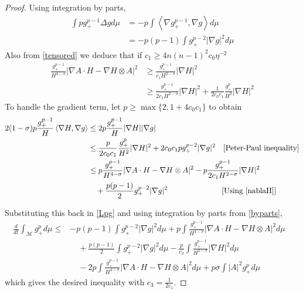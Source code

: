 \begin{proof}
    Using integration by parts, 
    \begin{align}
        \int pg_{+}^{p-1} \Delta g d \mu & = - p\int \left< \nabla g_{+}^{p-1}, \nabla g \right> d \mu \nonumber\\
        & = -p(p-1) \int g_{+}^{p-2}| \nabla g|^{2} d \mu \label{byparts}
    \end{align}
    Also from \cref{tensored} we deduce that if $ c_{1} \ge 4 n(n-1)^{2}c_{0} \eta^{-2} $ 
    \begin{align}
        \frac{g_{+}^{p-1}}{H^{4-\sigma}}|\nabla A \cdot H - \nabla H \otimes A|^{2} &\ge \frac{g_{+}^{p-1}}{c_{1}H^{2-\sigma}}| \nabla H|^{2} \nonumber\\
        & \ge \frac{g_{+}^{p-1}}{2c_{1}H^{2-\sigma}}| \nabla H|^{2} + \frac{1}{2c_{0}c_{1}} \frac{g_{+}^{p}}{H^{2}}| \nabla H|^{2} \label{nablaH}
    \end{align}
    To handle the gradient term, let $ p \ge \max \{2,1+4c_{0}c_{1} \} $ to obtain \begin{align*}
        2(1-\sigma)p \frac{g_{+}^{p-1}}{H} \left< \nabla H, \nabla g \right> & \le 2p \frac{g_{+}^{p-1}}{H} |\nabla H| |\nabla g| \\
        & \le \frac{p}{2c_{0}c_{1}} \frac{g_{+}^{p}}{H^{2}}|\nabla H|^{2} + 2c_{0}c_{1}pg_{+}^{p-2}|\nabla g|^{2} \quad [\text{Peter-Paul inequality}] \\
        & \le p \frac{g_{+}^{p-1}}{H^{4-\sigma}}|\nabla A \cdot H - \nabla H \otimes A|^{2} - p \frac{g_{+}^{p-1}}{2c_{1}H^{2-\sigma}}|\nabla H|^{2} \\
        & \quad + \frac{p(p-1)}{2}g_{+}^{p-2}|\nabla g|^{2} \qquad \qquad\quad  \qquad[\text{Using \cref{nablaH}}]
    \end{align*}

    Substituting this back in \cref{Lpg} and using integration by parts from \cref{byparts}, \begin{align*}
        \frac{d}{dt} \int_{ \mathcal{M}} g_{+}^{p} d \mu \le & -p(p-1)\int g_{+}^{p-2}|\nabla g|^{2} d \mu + p \int \frac{g_{+}^{p-1}}{H^{4-\sigma}}|\nabla A \cdot H - \nabla H \otimes A|^{2}d \mu & \\
        & \quad + \frac{p(p-1)}{2}\int g_{+}^{p-2}|\nabla g|^{2}d \mu - \frac{p}{c_{3}} \int \frac{g_{+}^{p-1}}{H^{2-\sigma}}|\nabla H|^{2} d \mu \\
        & \quad - 2p \int \frac{g_{+}^{p-1}}{H^{4-\sigma}}|\nabla A \cdot H - \nabla H \otimes A|^{2}d \mu + p \sigma \int |A|^{2}g_{+}^{p}d \mu
    \end{align*}
    which gives the desired inequality with $ c_{3} = \frac{1}{2c_{1}} $.
\end{proof}
